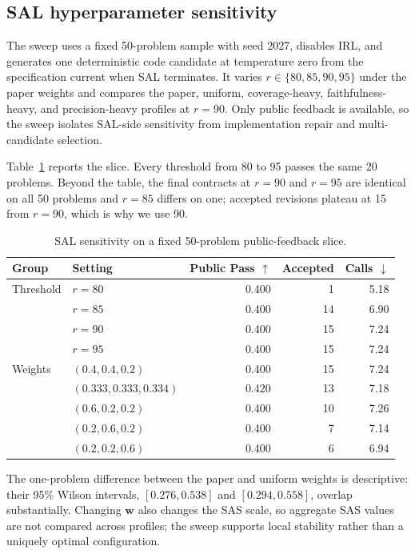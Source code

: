 \documentclass{article}
\newcommand{\up}{\ensuremath{\uparrow}}
\newcommand{\down}{\ensuremath{\downarrow}}
\begin{document}
\subsection{SAL hyperparameter sensitivity}
\label{app:sensitivity}

The sweep uses a fixed 50-problem sample with seed 2027, disables IRL, and generates one deterministic code candidate at temperature zero from the specification current when SAL terminates. It varies $r\in\{80,85,90,95\}$ under the paper weights and compares the paper, uniform, coverage-heavy, faithfulness-heavy, and precision-heavy profiles at $r=90$. Only public feedback is available, so the sweep isolates SAL-side sensitivity from implementation repair and multi-candidate selection.

Table~\ref{tab:sensitivity} reports the slice. Every threshold from 80 to 95 passes the same 20 problems. Beyond the table, the final contracts at $r=90$ and $r=95$ are identical on all 50 problems and $r=85$ differs on one; accepted revisions plateau at 15 from $r=90$, which is why we use 90.

\begin{table}[H]
\centering
\small
\begin{tabular}{@{}llrrr@{}}
\toprule
Group & Setting & Public Pass \up & Accepted & Calls \down \\
\midrule
Threshold & $r=80$ & 0.400 & 1 & 5.18 \\
& $r=85$ & 0.400 & 14 & 6.90 \\
& $r=90$ & 0.400 & 15 & 7.24 \\
& $r=95$ & 0.400 & 15 & 7.24 \\
\midrule
Weights & $(0.4,0.4,0.2)$ & 0.400 & 15 & 7.24 \\
& $(0.333,0.333,0.334)$ & 0.420 & 13 & 7.18 \\
& $(0.6,0.2,0.2)$ & 0.400 & 10 & 7.26 \\
& $(0.2,0.6,0.2)$ & 0.400 & 7 & 7.14 \\
& $(0.2,0.2,0.6)$ & 0.400 & 6 & 6.94 \\
\bottomrule
\end{tabular}
\caption{SAL sensitivity on a fixed 50-problem public-feedback slice.}
\label{tab:sensitivity}
\end{table}

The one-problem difference between the paper and uniform weights is descriptive: their 95\% Wilson intervals, $[0.276,0.538]$ and $[0.294,0.558]$, overlap substantially. Changing $\mathbf w$ also changes the SAS scale, so aggregate SAS values are not compared across profiles; the sweep supports local stability rather than a uniquely optimal configuration.
\end{document}
